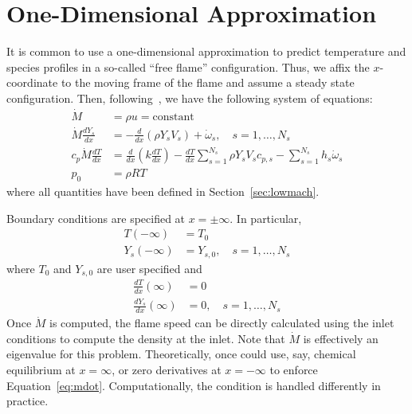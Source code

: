 
\section{One-Dimensional Approximation}\label{sec:1d}

It is common to use a one-dimensional approximation to predict
temperature and species profiles in a so-called ``free flame''
configuration. Thus, we affix the $x$-coordinate to the moving frame of the
flame and assume a steady state configuration. Then,
following~\cite{Smooke}, we have the following system of equations:
%
\begin{align}
  \dot{M} &= \rho u = \text{constant}\label{eq:mdot}\\
  \dot{M} \frac{dY_s}{dx} &= -\frac{d}{dx}\left( \rho Y_s V_s\right) +
  \dot{\omega}_s, \quad s=1,\dots,N_s \\
  c_p \dot{M} \frac{dT}{dx} &= \frac{d}{dx}\left( k \frac{dT}{dx}
  \right) - \frac{dT}{dx}\sum_{s=1}^{N_s} \rho Y_s V_s c_{p,s}  -
  \sum_{s=1}^{N_s} h_s \dot{\omega}_s \\
   p_0 &= \rho R T
\end{align}
%
where all quantities have been defined in
Section~\ref{sec:lowmach}.

Boundary conditions are specified at $x =
\pm \infty$. In particular,
%
\begin{align}
  T(-\infty) &= T_0 \\
  Y_s(-\infty) &= Y_{s,0}, \quad s = 1,\dots,N_s
\end{align}
%
where $T_0$ and $Y_{s,0}$ are user specified and
%
\begin{align}
  \frac{dT}{dx}(\infty) &= 0 \\
  \frac{dY_s}{dx}(\infty) &= 0, \quad s = 1,\dots,N_s
\end{align}
%
Once $\dot{M}$ is computed, the flame speed can be directly calculated
using the inlet conditions to compute the density at the inlet.
Note that $\dot{M}$ is effectively an eigenvalue for this problem.
Theoretically, once could use, say, chemical equilibrium at
$x=\infty$, or zero derivatives at $x=-\infty$ to enforce
Equation~\eqref{eq:mdot}. Computationally, the condition is handled
differently in practice.

